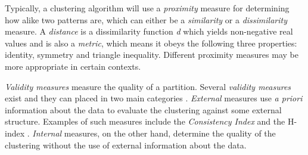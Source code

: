 
Typically, a clustering algorithm will use a \emph{proximity} measure for determining how alike two patterns are, which can either be a \emph{similarity} or a \emph{dissimilarity} measure.
A \emph{distance} is a dissimilarity function \emph{d} which yields non-negative real values and is also a \emph{metric}, which means it obeys the following three properties: identity, symmetry and triangle inequality.
Different proximity measures may be more appropriate in certain contexts.



\emph{Validity measures} measure the quality of a partition.
Several \emph{validity measures} exist and they can placed in two main categories \cite{Aggarwal2014}.
\emph{External} measures use \emph{a priori} information about the data to evaluate the clustering against some external structure.
Examples of such measures include the \emph{Consistency Index} \cite{Fred2001} and the H-index \cite{Meila2003}. %
\emph{Internal} measures, on the other hand, determine the quality of the clustering without the use of external information about the data.


